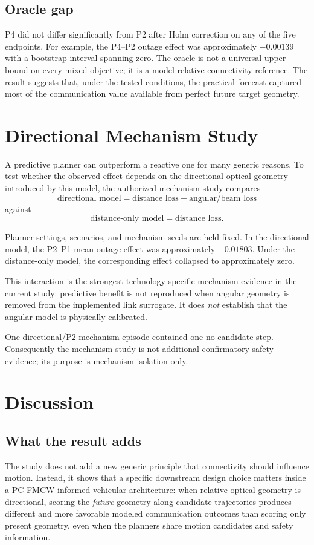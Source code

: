 \documentclass[journal]{IEEEtran}
\begin{document}
\subsection{Oracle gap}
P4 did not differ significantly from P2 after Holm correction on any of the five endpoints. For example, the P4--P2 outage effect was approximately $-0.00139$ with a bootstrap interval spanning zero. The oracle is not a universal upper bound on every mixed objective; it is a model-relative connectivity reference. The result suggests that, under the tested conditions, the practical forecast captured most of the communication value available from perfect future target geometry.

\section{Directional Mechanism Study}
A predictive planner can outperform a reactive one for many generic reasons. To test whether the observed effect depends on the directional optical geometry introduced by this model, the authorized mechanism study compares
\begin{equation}
\text{directional model}
=
\text{distance loss}+\text{angular/beam loss}
\end{equation}
against
\begin{equation}
\text{distance-only model}
=
\text{distance loss}.
\end{equation}

Planner settings, scenarios, and mechanism seeds are held fixed. In the directional model, the P2--P1 mean-outage effect was approximately $-0.01803$. Under the distance-only model, the corresponding effect collapsed to approximately zero.

This interaction is the strongest technology-specific mechanism evidence in the current study: predictive benefit is not reproduced when angular geometry is removed from the implemented link surrogate. It does \emph{not} establish that the angular model is physically calibrated.

One directional/P2 mechanism episode contained one no-candidate step. Consequently the mechanism study is not additional confirmatory safety evidence; its purpose is mechanism isolation only.

\section{Discussion}
\subsection{What the result adds}
The study does not add a new generic principle that connectivity should influence motion. Instead, it shows that a specific downstream design choice matters inside a PC-FMCW-informed vehicular architecture: when relative optical geometry is directional, scoring the \emph{future} geometry along candidate trajectories produces different and more favorable modeled communication outcomes than scoring only present geometry, even when the planners share motion candidates and safety information.
\end{document}

